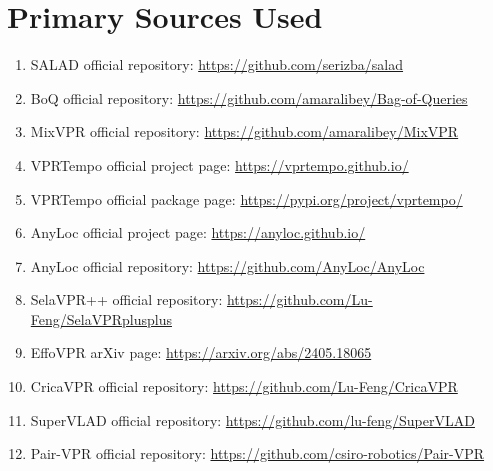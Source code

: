 \documentclass[11pt]{article}
\begin{document}
\section*{Primary Sources Used}
\begin{enumerate}[leftmargin=*]
  \item SALAD official repository: \url{https://github.com/serizba/salad}
  \item BoQ official repository: \url{https://github.com/amaralibey/Bag-of-Queries}
  \item MixVPR official repository: \url{https://github.com/amaralibey/MixVPR}
  \item VPRTempo official project page: \url{https://vprtempo.github.io/}
  \item VPRTempo official package page: \url{https://pypi.org/project/vprtempo/}
  \item AnyLoc official project page: \url{https://anyloc.github.io/}
  \item AnyLoc official repository: \url{https://github.com/AnyLoc/AnyLoc}
  \item SelaVPR++ official repository: \url{https://github.com/Lu-Feng/SelaVPRplusplus}
  \item EffoVPR arXiv page: \url{https://arxiv.org/abs/2405.18065}
  \item CricaVPR official repository: \url{https://github.com/Lu-Feng/CricaVPR}
  \item SuperVLAD official repository: \url{https://github.com/lu-feng/SuperVLAD}
  \item Pair-VPR official repository: \url{https://github.com/csiro-robotics/Pair-VPR}
\end{enumerate}
\end{document}
